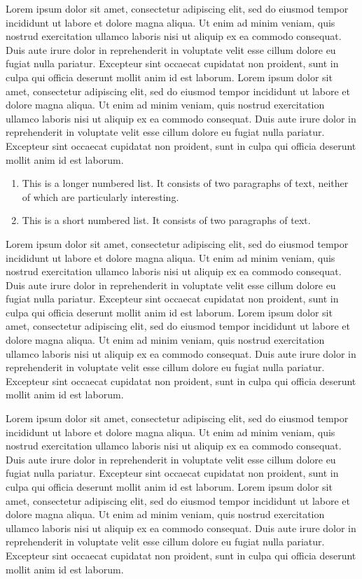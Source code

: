 \documentclass[english]{sbc2025}%
\begin{document}
Lorem ipsum dolor sit amet, consectetur adipiscing elit, sed do eiusmod tempor incididunt ut labore et dolore magna aliqua. Ut enim ad minim veniam, quis nostrud exercitation ullamco laboris nisi ut aliquip ex ea commodo consequat. Duis aute irure dolor in reprehenderit in voluptate velit esse cillum dolore eu fugiat nulla pariatur. Excepteur sint occaecat cupidatat non proident, sunt in culpa qui officia deserunt mollit anim id est laborum. Lorem ipsum dolor sit amet, consectetur adipiscing elit, sed do eiusmod tempor incididunt ut labore et dolore magna aliqua. Ut enim ad minim veniam, quis nostrud exercitation ullamco laboris nisi ut aliquip ex ea commodo consequat. Duis aute irure dolor in reprehenderit in voluptate velit esse cillum dolore eu fugiat nulla pariatur. Excepteur sint occaecat cupidatat non proident, sunt in culpa qui officia deserunt mollit anim id est laborum.

\begin{enumerate}%
\item This is a longer numbered list. It consists of two paragraphs of text, neither of which are particularly interesting.
\item This is a short numbered list. It consists of two paragraphs of text.
\end{enumerate}

Lorem ipsum dolor sit amet, consectetur adipiscing elit, sed do eiusmod tempor incididunt ut labore et dolore magna aliqua. Ut enim ad minim veniam, quis nostrud exercitation ullamco laboris nisi ut aliquip ex ea commodo consequat. Duis aute irure dolor in reprehenderit in voluptate velit esse cillum dolore eu fugiat nulla pariatur. Excepteur sint occaecat cupidatat non proident, sunt in culpa qui officia deserunt mollit anim id est laborum. Lorem ipsum dolor sit amet, consectetur adipiscing elit, sed do eiusmod tempor incididunt ut labore et dolore magna aliqua. Ut enim ad minim veniam, quis nostrud exercitation ullamco laboris nisi ut aliquip ex ea commodo consequat. Duis aute irure dolor in reprehenderit in voluptate velit esse cillum dolore eu fugiat nulla pariatur. Excepteur sint occaecat cupidatat non proident, sunt in culpa qui officia deserunt mollit anim id est laborum.

Lorem ipsum dolor sit amet, consectetur adipiscing elit, sed do eiusmod tempor incididunt ut labore et dolore magna aliqua. Ut enim ad minim veniam, quis nostrud exercitation ullamco laboris nisi ut aliquip ex ea commodo consequat. Duis aute irure dolor in reprehenderit in voluptate velit esse cillum dolore eu fugiat nulla pariatur. Excepteur sint occaecat cupidatat non proident, sunt in culpa qui officia deserunt mollit anim id est laborum. Lorem ipsum dolor sit amet, consectetur adipiscing elit, sed do eiusmod tempor incididunt ut labore et dolore magna aliqua. Ut enim ad minim veniam, quis nostrud exercitation ullamco laboris nisi ut aliquip ex ea commodo consequat. Duis aute irure dolor in reprehenderit in voluptate velit esse cillum dolore eu fugiat nulla pariatur. Excepteur sint occaecat cupidatat non proident, sunt in culpa qui officia deserunt mollit anim id est laborum.
\end{document}
